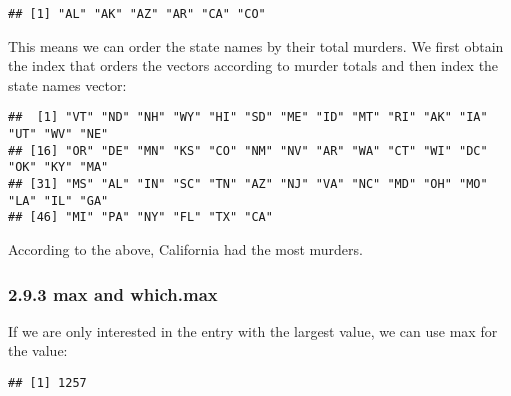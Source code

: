 \documentclass[
]{article}
\newenvironment{Shaded}{\begin{snugshade}}{\end{snugshade}}
\newcommand{\DecValTok}[1]{\textcolor[rgb]{0.00,0.00,0.81}{#1}}
\newcommand{\FunctionTok}[1]{\textcolor[rgb]{0.00,0.00,0.00}{#1}}
\newcommand{\NormalTok}[1]{#1}
\newcommand{\OtherTok}[1]{\textcolor[rgb]{0.56,0.35,0.01}{#1}}
\newcommand{\SpecialCharTok}[1]{\textcolor[rgb]{0.00,0.00,0.00}{#1}}
\begin{document}
\begin{Shaded}
\end{Shaded}

\begin{verbatim}
## [1] "AL" "AK" "AZ" "AR" "CA" "CO"
\end{verbatim}

This means we can order the state names by their total murders. We first
obtain the index that orders the vectors according to murder totals and
then index the state names vector:

\begin{Shaded}
\end{Shaded}

\begin{verbatim}
##  [1] "VT" "ND" "NH" "WY" "HI" "SD" "ME" "ID" "MT" "RI" "AK" "IA" "UT" "WV" "NE"
## [16] "OR" "DE" "MN" "KS" "CO" "NM" "NV" "AR" "WA" "CT" "WI" "DC" "OK" "KY" "MA"
## [31] "MS" "AL" "IN" "SC" "TN" "AZ" "NJ" "VA" "NC" "MD" "OH" "MO" "LA" "IL" "GA"
## [46] "MI" "PA" "NY" "FL" "TX" "CA"
\end{verbatim}

According to the above, California had the most murders.

\hypertarget{max-and-which.max}{%
\subsubsection{2.9.3 max and which.max}\label{max-and-which.max}}

If we are only interested in the entry with the largest value, we can
use max for the value:

\begin{Shaded}
\end{Shaded}

\begin{verbatim}
## [1] 1257
\end{verbatim}
\end{document}
